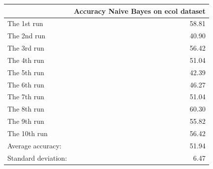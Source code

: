 \begin{tabular}{lr}
\toprule
{} &  Accuracy Naive Bayes on ecol dataset \\
\midrule
The 1st run         &                                 58.81 \\
The 2nd run         &                                 40.90 \\
The 3rd run         &                                 56.42 \\
The 4th run         &                                 51.04 \\
The 5th run         &                                 42.39 \\
The 6th run         &                                 46.27 \\
The 7th run         &                                 51.04 \\
The 8th run         &                                 60.30 \\
The 9th run         &                                 55.82 \\
The 10th run        &                                 56.42 \\
Average accuracy:   &                                 51.94 \\
Standard deviation: &                                  6.47 \\
\bottomrule
\end{tabular}
